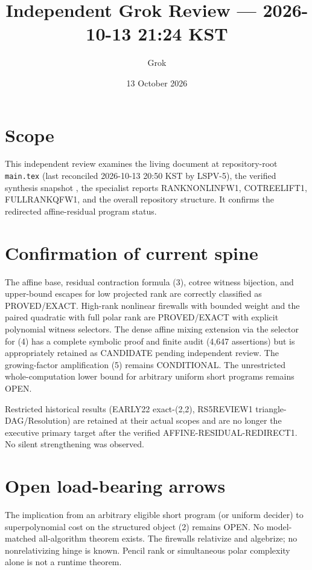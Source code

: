 \documentclass[11pt]{article}
\title{Independent Grok Review --- 2026-10-13 21:24 KST}
\author{Grok}
\date{13 October 2026}
\begin{document}
\maketitle

\begin{center}
\end{center}

\section{Scope}
This independent review examines the living document at repository-root \texttt{main.tex} (last reconciled 2026-10-13 20:50 KST by LSPV-5), the verified synthesis snapshot , the specialist reports RANKNONLINFW1, COTREELIFT1, FULLRANKQFW1, and the overall repository structure. It confirms the redirected affine-residual program status.

\section{Confirmation of current spine}
The affine base, residual contraction formula (3), cotree witness bijection, and upper-bound escapes for low projected rank are correctly classified as PROVED/EXACT. High-rank nonlinear firewalls with bounded weight and the paired quadratic with full polar rank are PROVED/EXACT with explicit polynomial witness selectors. The dense affine mixing extension via the selector for (4) has a complete symbolic proof and finite audit (4,647 assertions) but is appropriately retained as CANDIDATE pending independent review. The growing-factor amplification (5) remains CONDITIONAL. The unrestricted whole-computation lower bound for arbitrary uniform short programs remains OPEN.

Restricted historical results (EARLY22 exact-(2,2), RS5REVIEW1 triangle-DAG/Resolution) are retained at their actual scopes and are no longer the executive primary target after the verified AFFINE-RESIDUAL-REDIRECT1. No silent strengthening was observed.

\section{Open load-bearing arrows}
The implication from an arbitrary eligible short program (or uniform decider) to superpolynomial cost on the structured object (2) remains OPEN. No model-matched all-algorithm theorem exists. The firewalls relativize and algebrize; no nonrelativizing hinge is known. Pencil rank or simultaneous polar complexity alone is not a runtime theorem.
\end{document}
